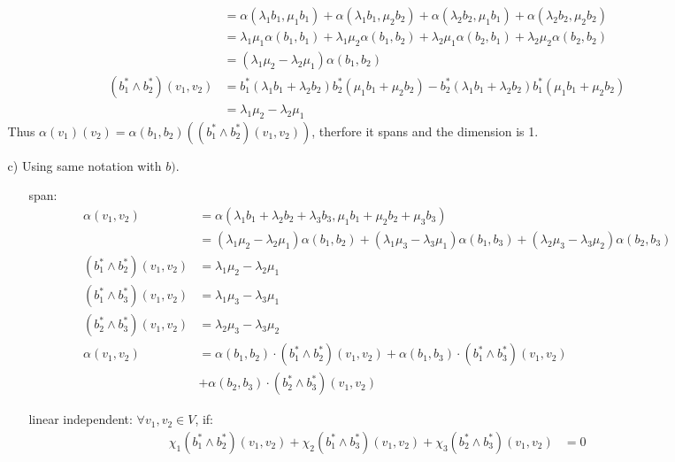 \documentclass{article}
\begin{document}
\begin{itemize}
\begin{itemize}
\begin{align*}
            &=\alpha(\lambda_1b_1,\mu_1b_1)+\alpha(\lambda_1b_1,\mu_2b_2)+\alpha(\lambda_2b_2,\mu_1b_1)+\alpha(\lambda_2b_2,\mu_2b_2)\\
            &=\lambda_1\mu_1\alpha(b_1,b_1)+\lambda_1\mu_2\alpha(b_1,b_2)+\lambda_2\mu_1\alpha(b_2,b_1)+\lambda_2\mu_2\alpha(b_2,b_2)\\
            &=(\lambda_1\mu_2-\lambda_2\mu_1)\alpha(b_1,b_2)\\
            (b^*_1\wedge b^*_2)(v_1,v_2)&=b^*_1(\lambda_1b_1+\lambda_2b_2)b_2^*(\mu_1b_1+\mu_2b_2)-b^*_2(\lambda_1b_1+\lambda_2b_2)b_1^*(\mu_1b_1+\mu_2b_2)\\
            &=\lambda_1\mu_2-\lambda_2\mu_1
        \end{align*}
        Thus \(\alpha(v_1)(v_2) = \alpha(b_1,b_2)((b^*_1\wedge b^*_2)(v_1,v_2)) \), therfore it spans and the dimension is 1.
        \newpage
        \item [c)] Using same notation with \(b)\).
        \begin{itemize}
            \item [span:]
            \begin{align*}
                \alpha(v_1,v_2)&=\alpha(\lambda_1b_1+\lambda_2b_2+\lambda_3b_3,\mu_1b_1+\mu_2b_2+\mu_3b_3)\\
                &=(\lambda_1\mu_2-\lambda_2\mu_1)\alpha(b_1,b_2)+(\lambda_1\mu_3-\lambda_3\mu_1)\alpha(b_1,b_3)+(\lambda_2\mu_3-\lambda_3\mu_2)\alpha(b_2,b_3)
                \\(b^*_1\wedge b^*_2)(v_1,v_2)&=\lambda_1\mu_2-\lambda_2\mu_1\\
                (b^*_1\wedge b^*_3)(v_1,v_2)&=\lambda_1\mu_3-\lambda_3\mu_1\\
                (b^*_2\wedge b^*_3)(v_1,v_2)&=\lambda_2\mu_3-\lambda_3\mu_2\\
                \alpha(v_1,v_2)&=\alpha(b_1,b_2)\cdot(b^*_1\wedge b^*_2)(v_1,v_2)+\alpha(b_1,b_3)\cdot(b^*_1\wedge b^*_3)(v_1,v_2)\\ 
                &+\alpha(b_2,b_3)\cdot(b^*_2\wedge b^*_3)(v_1,v_2)
            \end{align*}
            \item [linear independent:]\(\forall v_1,v_2 \in V\), if:
            \begin{align*}
                \chi_1(b^*_1\wedge b^*_2)(v_1,v_2)+ \chi_2(b^*_1\wedge b^*_3)(v_1,v_2)+\chi_3(b^*_2\wedge b^*_3)(v_1,v_2)&=0\\
            \end{align*}

\end{itemize}
\end{itemize}
\end{itemize}
\end{document}

